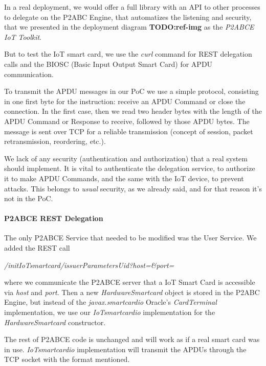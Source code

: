 In a real deployment, we would offer a full library with an API to other processes to delegate on the P2ABC Engine, that automatizes the listening and security, that we presented in the deployment diagram \textbf{TODO:ref-img} as the \textit{P2ABCE IoT Toolkit}.

But to test the IoT smart card, we use the \textit{curl} command for REST delegation calls and the BIOSC (Basic Input Output Smart Card) for APDU communication.

To transmit the APDU messages in our PoC we use a simple protocol, consisting in one first byte for the instruction: receive an APDU Command or close the connection. In the first case, then we read two header bytes with the length of the APDU Command or Response to receive, followed by those APDU bytes. The message is sent over TCP for a reliable transmission (concept of session, packet retransmission, reordering, etc.).

We lack of any security (authentication and authorization) that a real system should implement. It is vital to authenticate the delegation service, to authorize it to make APDU Commands, and the same with the IoT device, to prevent attacks. This belongs to \textit{usual} security, as we already said, and for that reason it's not in the PoC.

\paragraph{P2ABCE REST Delegation}


The only P2ABCE Service that needed to be modified was the User Service. We added the REST call

\begin{center}
	\textit{/initIoTsmartcard/{issuerParametersUid}?host=\&port=}
\end{center}

where we communicate the P2ABCE server that a IoT Smart Card is accessible via \textit{host} and \textit{port}. Then a new \textit{HardwareSmartcard} object is stored in the P2ABC Engine, but instead of the \textit{javax.smartcardio} Oracle's \textit{CardTerminal} implementation, we use our \textit{IoTsmartcardio} implementation for the \textit{HardwareSmartcard} constructor.

The rest of P2ABCE code is unchanged and will work as if a real smart card was in use. \textit{IoTsmartcardio} implementation will transmit the APDUs through the TCP socket with the format mentioned.


